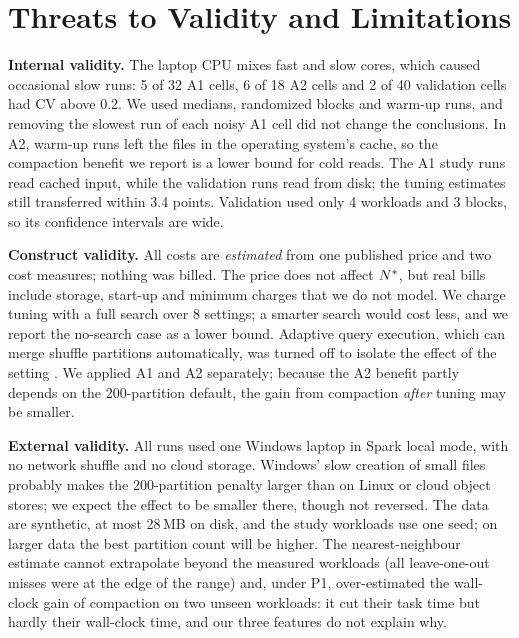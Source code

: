 \section{Threats to Validity and Limitations}
\label{sec:threats}

\textbf{Internal validity.} The laptop CPU mixes fast and slow cores, which caused occasional
slow runs: 5 of 32 A1 cells, 6 of 18 A2 cells and 2 of 40 validation cells had CV above 0.2.
We used medians, randomized blocks and warm-up runs, and removing the slowest run of each noisy
A1 cell did not change the conclusions. In A2, warm-up runs left the files in the operating
system's cache, so the compaction benefit we report is a lower bound for cold reads. The A1
study runs read cached input, while the validation runs read from disk; the tuning estimates
still transferred within 3.4 points. Validation used only 4 workloads and 3 blocks, so its
confidence intervals are wide.

\textbf{Construct validity.} All costs are \emph{estimated} from one published price and two
cost measures; nothing was billed. The price does not affect $N^{*}$, but real bills include
storage, start-up and minimum charges that we do not model. We charge tuning with a full search
over 8 settings; a smarter search would cost less, and we report the no-search case as a lower
bound. Adaptive query execution, which can merge shuffle partitions automatically, was turned
off to isolate the effect of the setting \cite{spark2024tuning}. We applied A1 and A2 separately;
because the A2 benefit partly depends on the 200-partition default, the gain from compaction
\emph{after} tuning may be smaller.

\textbf{External validity.} All runs used one Windows laptop in Spark local mode, with no
network shuffle and no cloud storage. Windows' slow creation of small files probably makes the
200-partition penalty larger than on Linux or cloud object stores; we expect the effect to be
smaller there, though not reversed. The data are synthetic, at most 28\,MB on disk, and the
study workloads use one seed; on larger data the best partition count will be higher. The
nearest-neighbour estimate cannot extrapolate beyond the measured workloads (all leave-one-out
misses were at the edge of the range) and, under P1, over-estimated the wall-clock gain of
compaction on two unseen workloads: it cut their task time but hardly their wall-clock time,
and our three features do not explain why.
